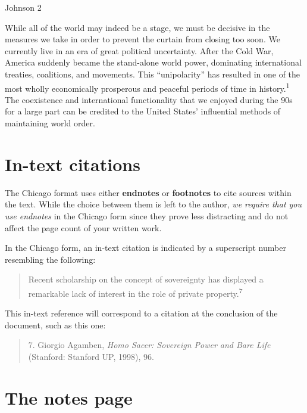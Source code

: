 

\thispagestyle{empty}
\begin{flushright}Johnson 2\end{flushright}
\bigskip
\begin{Spacing}{2}

 While all of the world may indeed be a stage, we must be decisive in the measures we take in order to prevent the curtain from closing too soon. We currently live in an era of great political uncertainty. After the Cold War, America suddenly became the stand-alone world power, dominating international treaties, coalitions, and movements. This ``unipolarity'' has resulted in one of the most wholly economically prosperous and peaceful periods of time in history.\textsuperscript{1} The coexistence and international functionality that we enjoyed during the 90s for a large part can be credited to the United States' influential methods of maintaining world order.
\end{Spacing}
\newpage



\section {In-text citations}
The Chicago format uses either \textbf{endnotes} or \textbf{footnotes} to cite sources within the text. While the choice between them is left to the author, \emph{we require that you use endnotes} in the Chicago form since they prove less distracting and do not affect the page count of your written work. 

In the Chicago form, an in-text citation is indicated by a superscript number resembling the following:

\begin{quote}
Recent scholarship on the concept of sovereignty has displayed a remarkable lack of interest in the role of private property.\textsuperscript{7}
\end{quote}
This in-text reference will correspond to a citation at the conclusion of the document, such as this one:

\begin{quote}
 7. Giorgio Agamben, \emph{Homo Sacer: Sovereign Power and Bare Life} (Stanford: Stanford UP, 1998), 96.
\end{quote}


\section{The notes page}


